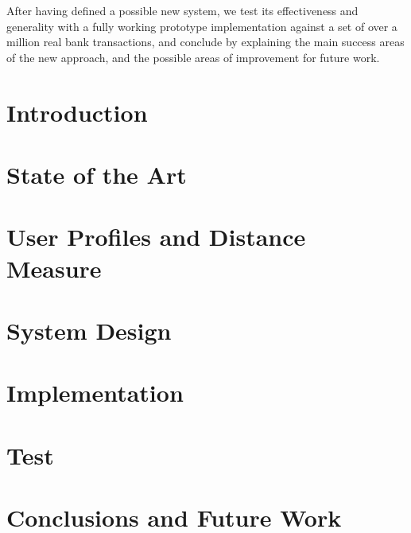 \documentclass[letterpaper,11pt,oneside,final]{uicthesis}
\begin{document}
   After having defined a possible new system, we test its effectiveness and generality with a fully working prototype implementation against a set of over a million real bank transactions, and conclude by explaining the main success areas of the new approach, and the possible areas of improvement for future work.

	\chapter{Introduction} \label{introduction}
		
	\chapter{State of the Art} \label{soa}
		
	\chapter{User Profiles and Distance Measure} \label{profiles}
		
	\chapter{System Design} \label{design}
		
	\chapter{Implementation} \label{implementation}
		
	\chapter{Test} \label{test}
		
	\chapter{Conclusions and Future Work} \label{conclusions}
		

	\clearpage

	\clearpage
	\bib
	
	\nocite{*}

	\newpage

	
\end{document}
